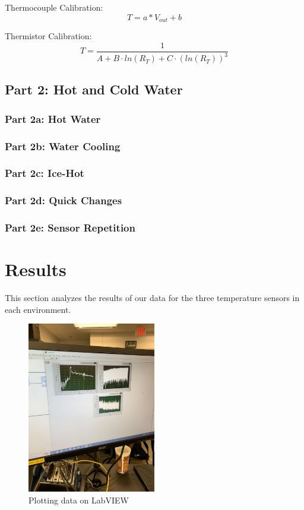 \documentclass{article}
\begin{document}
Thermocouple Calibration:
\[
    T = a * V_{out} + b
\]

Thermistor Calibration:
\[
    T = \dfrac{1}{A + B\cdot ln(R_{T}) + C\cdot (ln(R_{T}))^{3}}
\]




\subsection{Part 2: Hot and Cold Water}

\subsubsection{Part 2a: Hot Water} %



\subsubsection{Part 2b: Water Cooling} %


\subsubsection{Part 2c: Ice-Hot} %


\subsubsection{Part 2d: Quick Changes} %


\subsubsection{Part 2e: Sensor Repetition} %



\section{Results}
This section analyzes the results of our data for the three temperature sensors in each environment.

\begin{figure}[H]
    \centering
    \includegraphics[width=0.5\textwidth, angle = -90]{lab2images/labview_plots.jpg}
    \caption{Plotting data on LabVIEW}
    \end{figure}
    
\end{document}
